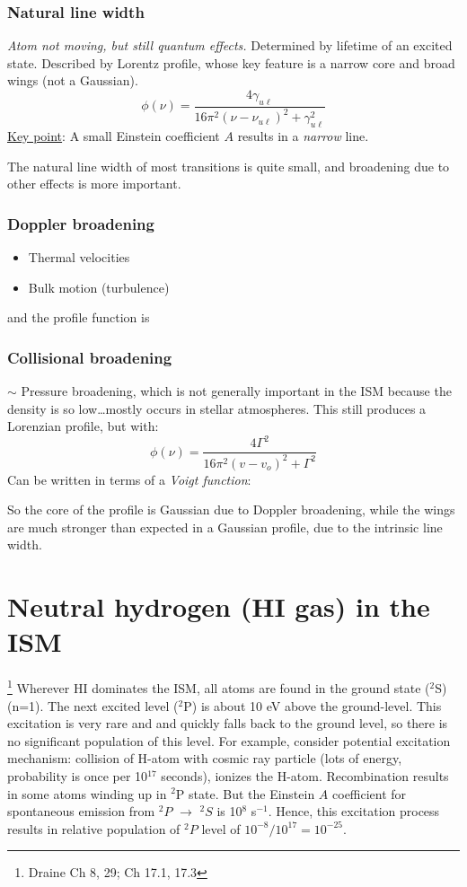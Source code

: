 \documentclass[11pt]{article}
\newcommand{\mar}[1]{\hspace{0pt}\marginpar{-\textcolor{black}{#1}-}}
\newcommand{\mynotes}[1]{{\fontfamily{cmss}\selectfont \textit{#1}}}
\let\oldsection\section
\renewcommand\section{\clearpage\oldsection}
\begin{document}
\subsubsection{Natural line width}
\mynotes{Atom not moving, but still quantum effects.}
Determined by lifetime of an excited state. Described by Lorentz profile,
whose key feature is a narrow core and broad wings (not a Gaussian).
\[
    \phi(\nu)
    = \frac{4\gamma_{u\ell}}{16\pi^{2} (\nu - \nu_{u\ell})^{2} +
    \gamma_{u\ell}^{2} }
    \]
\underline{Key point}: A small Einstein coefficient $A$ results
in a \emph{narrow} line.

The natural line width of most transitions is quite small, and broadening
due to other effects is more important.
\subsubsection{Doppler broadening}
\begin{itemize}
    \item Thermal velocities
    \item Bulk motion (turbulence)
\end{itemize}

and\mar{32} the profile function is

\subsubsection{Collisional broadening}
$\sim$ Pressure broadening, which is not generally important in the ISM because
the density is so low\ldots mostly occurs in stellar atmospheres.
This still produces a Lorenzian profile, but with:
\[
    \phi(\nu) = \frac{4\Gamma^{2}}{16\pi^{2}(v-v_{o})^{2} + \Gamma^{2}}
    \]
Can be written in terms of a \emph{Voigt function}:

\mar{33}So the core of the profile is Gaussian due to Doppler broadening,
while the wings are much stronger than expected in a Gaussian profile,
due to the intrinsic line width.

\newpage
\section{Neutral hydrogen (HI gas) in the ISM}
\footnote{Draine Ch 8, 29; Ch 17.1, 17.3}
Wherever HI dominates the ISM, all atoms are found in the ground state
($^{2}$S)(n=1). The next excited level ($^{2}$P) is about 10 eV above the
ground-level. This excitation is very rare and and quickly falls back to the
ground level, so there is no significant population of this level. For example,
consider potential excitation mechanism: collision of H-atom with cosmic ray
particle (lots of energy, probability is once per 10$^{17}$ seconds), ionizes
the H-atom. Recombination results in some atoms winding up in $^{2}$P state.
But the Einstein $A$ coefficient for spontaneous emission from $^{2}P$
$\rightarrow$ $^{2}S$ is 10$^{8}$ s$^{-1}$. Hence, this excitation process
results in relative population of $^{2}P$ level of $10^{-8}/10^{17} =
10^{-25}$.
\end{document}
